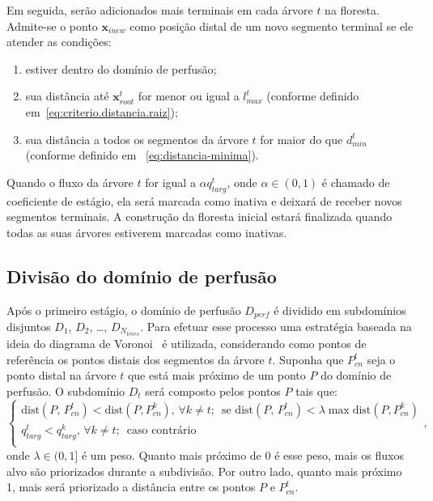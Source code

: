 Em seguida, serão adicionados mais terminais em cada árvore $t$ na floresta.
Admite-se o ponto $\mathbf{x}_{inew}$ 
como posição distal de um novo segmento terminal se ele atender as condições:
\begin{enumerate}[label=(\roman*)]
 \item estiver dentro do domínio de perfusão;
 \item sua distância 
até $\mathbf{x}_{root}^t$ for menor ou igual a $l_{max}^t$ 
(conforme definido em~\eqref{eq:criterio.distancia.raiz});
 \item sua distância a todos os segmentos da árvore $t$ for maior do que 
 $d_{min}^t$ (conforme definido em ~\eqref{eq:distancia-minima}).
\end{enumerate}

Quando o fluxo da árvore $t$ for igual a $\alpha q_{targ}^t$, onde 
$\alpha\in(0,1)$ é chamado de coeficiente de estágio,
ela será marcada como inativa e deixará de receber novos segmentos terminais.
A construção da floresta inicial estará finalizada quando todas as suas árvores
estiverem marcadas como inativas.

\subsection{Divisão do domínio de perfusão}\label{subsec:divisao-do-dominio-de-perfusao}

Após o primeiro estágio, o domínio de perfusão $D_{perf}$ é dividido em subdomínios 
disjuntos $D_1$, $D_2$, \ldots, $D_{N_{trees}}$. Para efetuar esse processo uma 
estratégia baseada na ideia do diagrama de Voronoi~\cite{Aurenhammer2004} é utilizada,
considerando como pontos de referência os pontos distais dos segmentos da árvore $t$.
Suponha que $P_{cn}^t$ seja o ponto distal na árvore $t$ que está mais próximo de um ponto $P$ do
domínio de perfusão. O subdomínio $D_t$ será composto pelos pontos 
$P$ tais que:
\begin{equation}
  \begin{cases}
	\mathrm{dist}(P,\,P_{cn}^t) < \mathrm{dist}(P, P_{cn}^k),\, \forall k\neq t;\,\textrm{ se }\mathrm{dist}(P,\,P_{cn}^t) < \lambda\max \mathrm{dist}(P, P_{cn}^k)\\
	q_{targ}^t < q_{targ}^k,\, \forall k\neq t;\,\textrm{ caso contr\'ario}\\
  \end{cases},
  \label{def:diagrama-voronoi-coat}
\end{equation}
onde $\lambda\in(0, 1]$ é um peso. Quanto mais próximo de 0 é esse peso, 
mais os fluxos alvo são priorizados durante a subdivisão. Por outro lado, quanto
mais próximo 1, mais será priorizado a distância entre os pontos $P$ e $P_{cn}^t$.

